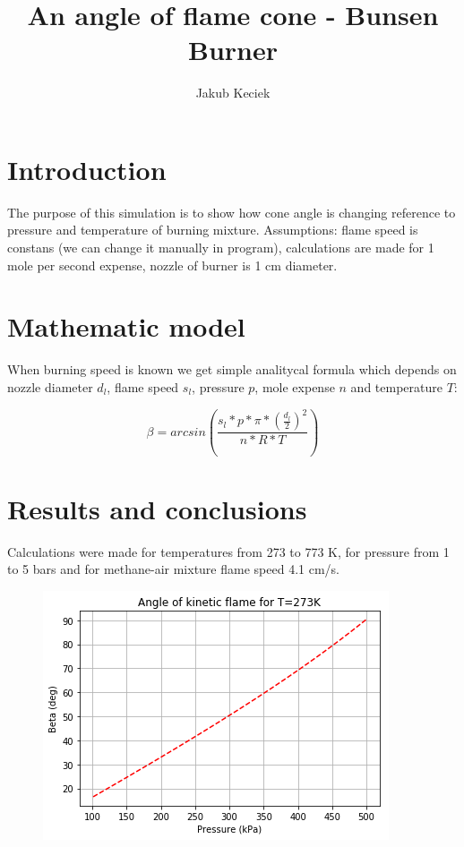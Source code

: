 \documentclass[a4paper]{article}
\title{An angle of flame cone - Bunsen Burner}
\author{Jakub Keciek}
\begin{document}
\maketitle
\section{Introduction}

The purpose of this simulation is to show how cone angle is changing reference to pressure and temperature of burning mixture. Assumptions: flame speed is constans (we can change it manually in program), calculations are made for 1 mole per second expense, nozzle of burner is 1 cm diameter.

\section{Mathematic model}

When burning speed is known we get simple analitycal formula which depends on nozzle diameter $d_l$, flame speed $s_l$, pressure $p$, mole expense $n$ and temperature $T$:

\[\beta = arcsin(\frac{s_l*p*\pi*(\frac{d_l}{2})^2}{n*R*T})\]
\section{Results and conclusions}

Calculations were made for temperatures from 273 to 773 K, for pressure from 1 to 5 bars and for methane-air mixture flame speed 4.1 cm/s.


\begin{figure}[!h]
\centering
\includegraphics[scale=0.5]{1.png}
\end{figure}
\end{document}
